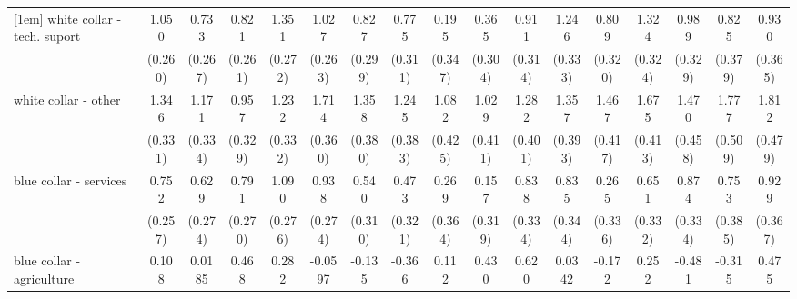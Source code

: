 {\begin{tabular}{l*{16}{c}}
[1em]
white collar - tech. suport&       1.050\sym{***}&       0.733\sym{**} &       0.821\sym{**} &       1.351\sym{***}&       1.027\sym{***}&       0.827\sym{**} &       0.775\sym{*}  &       0.195         &       0.365         &       0.911\sym{**} &       1.246\sym{***}&       0.809\sym{*}  &       1.324\sym{***}&       0.989\sym{**} &       0.825\sym{*}  &       0.930\sym{*}  \\
                    &     (0.260)         &     (0.267)         &     (0.261)         &     (0.272)         &     (0.263)         &     (0.299)         &     (0.311)         &     (0.347)         &     (0.304)         &     (0.314)         &     (0.333)         &     (0.320)         &     (0.324)         &     (0.329)         &     (0.379)         &     (0.365)         \\
[1em]
white collar - other&       1.346\sym{***}&       1.171\sym{***}&       0.957\sym{**} &       1.232\sym{***}&       1.714\sym{***}&       1.358\sym{***}&       1.245\sym{**} &       1.082\sym{*}  &       1.029\sym{*}  &       1.282\sym{**} &       1.357\sym{***}&       1.467\sym{***}&       1.675\sym{***}&       1.470\sym{**} &       1.777\sym{***}&       1.812\sym{***}\\
                    &     (0.331)         &     (0.334)         &     (0.329)         &     (0.332)         &     (0.360)         &     (0.380)         &     (0.383)         &     (0.425)         &     (0.411)         &     (0.401)         &     (0.393)         &     (0.417)         &     (0.413)         &     (0.458)         &     (0.509)         &     (0.479)         \\
[1em]
blue collar - services&       0.752\sym{**} &       0.629\sym{*}  &       0.791\sym{**} &       1.090\sym{***}&       0.938\sym{***}&       0.540         &       0.473         &       0.269         &       0.157         &       0.838\sym{*}  &       0.835\sym{*}  &       0.265         &       0.651\sym{*}  &       0.874\sym{**} &       0.753         &       0.929\sym{*}  \\
                    &     (0.257)         &     (0.274)         &     (0.270)         &     (0.276)         &     (0.274)         &     (0.310)         &     (0.321)         &     (0.364)         &     (0.319)         &     (0.334)         &     (0.344)         &     (0.336)         &     (0.332)         &     (0.334)         &     (0.385)         &     (0.367)         \\
[1em]
blue collar - agriculture&       0.108         &      0.0185         &       0.468         &       0.282         &     -0.0597         &      -0.135         &      -0.366         &       0.112         &       0.430         &       0.620         &      0.0342         &      -0.172         &       0.252         &      -0.481         &      -0.315         &       0.475         \\

\end{tabular}}
